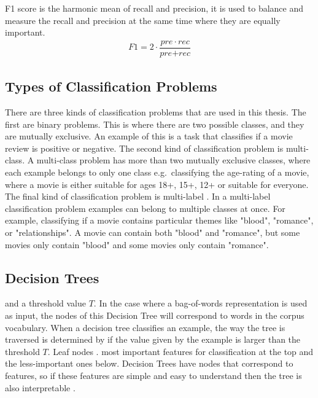 F1 score is the harmonic mean of recall and precision, it is used to balance and measure the recall and precision at the same time where they are equally important. 
\begin{equation}
\begin{align}
{F1} = 2 \cdot \dfrac{\textit{pre} \cdot {rec}}{\textit{pre} + \textit{rec}}
\end{align}
\end{equation}
\subsection{Types of Classification Problems}\label{bg:multi-label}


There are three kinds of classification problems that are used in this thesis. The first are binary problems. This is where there are two possible classes, and they are mutually exclusive. An example of this is a task that classifies if a movie review is positive or negative. The second kind of classification problem is multi-class. A multi-class problem has more than two mutually exclusive classes, where each example belongs to only one class e.g.\ classifying the age-rating of a movie, where a movie is either suitable for ages 18+, 15+, 12+ or suitable for everyone. The final kind of classification problem is multi-label . In a multi-label classification problem examples can belong to multiple classes at once. For example, classifying if a movie contains particular themes like "blood", "romance", or "relationships". A movie can contain both "blood" and "romance", but some movies only contain "blood" and some movies only contain "romance". 


\subsection{Decision Trees}\label{bg:trees}

  and  a  threshold value $T$. In the case where a bag-of-words representation is used as input, the nodes of this Decision Tree will correspond to  words in the corpus vocabulary. When a decision tree classifies an example, the way the tree is traversed is determined by if the value given by the example is larger than the threshold $T$. Leaf nodes  .  most important features for classification at the top and the less-important ones below. Decision Trees have nodes that correspond to features, so if these features are simple and easy to understand then the tree is also interpretable \cite{Ustun2014}. 

